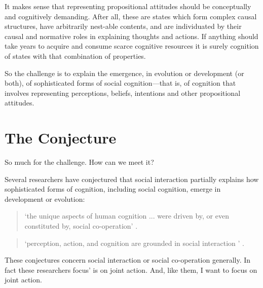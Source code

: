 \documentclass[12pt,a4paper]{extarticle}
\begin{document}
It makes sense that representing propositional attitudes should be conceptually and cognitively demanding.  
After all, these are states which form complex causal structures, have arbitrarily nest-able contents, and are individuated by their causal and normative roles in explaining thoughts and actions.  
If anything should take years to acquire and consume scarce cognitive resources it is surely cognition of states with that combination of properties.



So the challenge is to explain the emergence, in evolution or development (or both), of sophisticated forms of social cognition---that is, of cognition that involves representing  perceptions, beliefs, intentions and other propositional attitudes.






\section{The Conjecture}
So much for the challenge.
How can we meet it?

Several researchers have conjectured that social interaction partially explains how sophisticated forms of cognition, including social cognition, emerge in development or evolution:
%
\begin{quote} 
`the unique aspects of human cognition ... were driven by, or even constituted by, social co-operation'
\citep[p.\ 1]{Moll:2007gu}.
\end{quote}
%
\begin{quote} 
`perception, action, and cognition are grounded in social interaction%
' \citep[p.\ 103]{Knoblich:2006bn}.
\end{quote}
%
These conjectures concern social interaction or social co-operation generally.
In fact these researchers focus' is on joint action.
And, like them, I want to focus on joint action.
\end{document}
